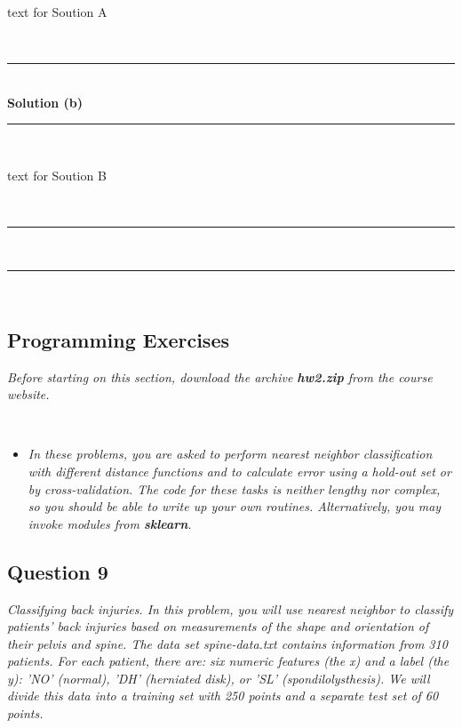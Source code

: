 \documentclass{article}
\begin{document}
\parbox{\textwidth}{text for Soution A}\\

\noindent\rule{\textwidth}{0.4pt}\\

\textbf{Solution (b)}

\noindent\rule{\textwidth}{0.4pt}\\

\parbox{\textwidth}{text for Soution B}\\

\noindent\rule{\textwidth}{0.4pt}\\

\noindent\rule{\textwidth}{0.4pt}\\


\newpage

\subsection*{Programming Exercises}

\parbox{\textwidth}{\textit{Before starting on this section, download the archive \textbf{hw2.zip} from the course website.}}\\
\begin{itemize}
    \item \textit{In these problems, you are asked to perform nearest neighbor classification with different distance functions and to calculate error using a hold-out set or by cross-validation. The code for these tasks is neither lengthy nor complex, so you should be able to write up your own routines. Alternatively, you may invoke modules from \textbf{sklearn}.}
\end{itemize}

\parbox{\textwidth}{}

\subsection*{Question 9}

\textit{Classifying back injuries. In this problem, you will use nearest neighbor to classify patients' back
injuries based on measurements of the shape and orientation of their pelvis and spine.
The data set spine-data.txt contains information from 310 patients. For each patient, there are:
six numeric features (the x) and a label (the y): 'NO' (normal), 'DH' (herniated disk), or 'SL'
(spondilolysthesis). We will divide this data into a training set with 250 points and a separate test set
of 60 points.}
\end{document}
